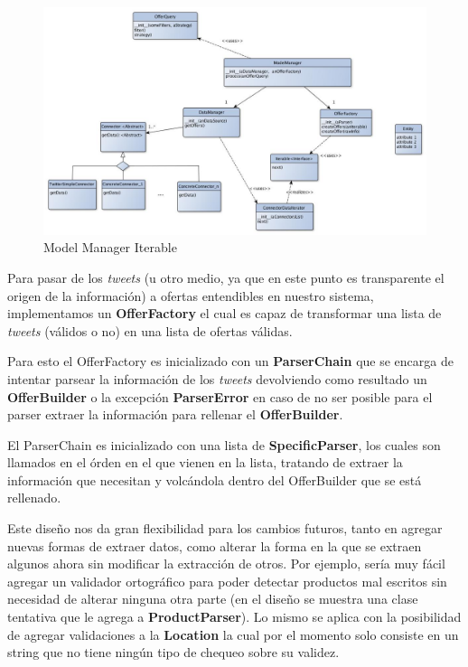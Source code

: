 \documentclass[10pt, a4paper]{article}
\begin{document}
\begin{figure}[H]
\centering
\includegraphics[scale=0.55]{graphics/model_manager_iterable_class.jpg}
\caption{Model Manager Iterable}
\end{figure}



\newpage
Para pasar de los \emph{tweets} (u otro medio, ya que en este punto es transparente el origen de la información) a ofertas entendibles en nuestro sistema, implementamos un \textbf{OfferFactory} el cual es capaz de transformar una lista de \emph{tweets} (válidos o no) en una lista de ofertas válidas.

Para esto el OfferFactory es inicializado con un \textbf{ParserChain} que se encarga de intentar parsear la información de los \emph{tweets} devolviendo como resultado un \textbf{OfferBuilder} o la excepción  \textbf{ParserError} en caso de no ser posible para el parser extraer la información para rellenar el \textbf{OfferBuilder}.

El ParserChain es inicializado con una lista de \textbf{SpecificParser}, los cuales son llamados en el órden en el que vienen en la lista, tratando de extraer la información que necesitan y volcándola dentro del OfferBuilder que se está rellenado.

Este diseño nos da gran flexibilidad para los cambios futuros, tanto en agregar nuevas formas de extraer datos, como alterar la forma en la que se extraen algunos ahora sin modificar la extracción de otros. Por ejemplo, sería muy fácil agregar un validador ortográfico para poder detectar productos mal escritos sin necesidad de alterar ninguna otra parte (en el diseño se muestra una clase tentativa que le agrega a \textbf{ProductParser}). Lo mismo se aplica con la posibilidad de agregar validaciones a la \textbf{Location} la cual por el momento solo consiste en un string que no tiene ningún tipo de chequeo sobre su validez.
\end{document}
